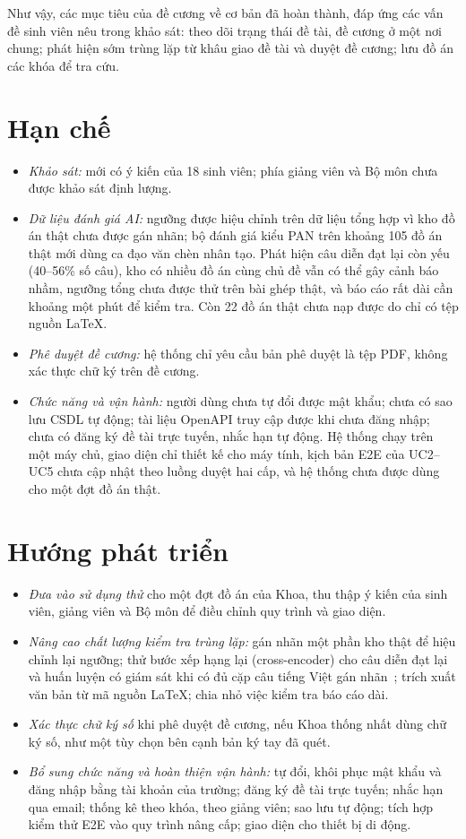 \documentclass[../main.tex]{subfiles}
\begin{document}
Như vậy, các mục tiêu của đề cương về cơ bản đã hoàn thành, đáp ứng các vấn đề sinh viên nêu trong khảo sát: theo dõi trạng thái đề tài, đề cương ở một nơi chung; phát hiện sớm trùng lặp từ khâu giao đề tài và duyệt đề cương; lưu đồ án các khóa để tra cứu.

\section*{Hạn chế}

\begin{itemize}
    \item \textit{Khảo sát:} mới có ý kiến của 18 sinh viên; phía giảng viên và Bộ môn chưa được khảo sát định lượng.
    \item \textit{Dữ liệu đánh giá AI:} ngưỡng được hiệu chỉnh trên dữ liệu tổng hợp vì kho đồ án thật chưa được gán nhãn; bộ đánh giá kiểu PAN trên khoảng 105 đồ án thật mới dùng ca đạo văn chèn nhân tạo. Phát hiện câu diễn đạt lại còn yếu (40--56\% số câu), kho có nhiều đồ án cùng chủ đề vẫn có thể gây cảnh báo nhầm, ngưỡng tổng chưa được thử trên bài ghép thật, và báo cáo rất dài cần khoảng một phút để kiểm tra. Còn 22 đồ án thật chưa nạp được do chỉ có tệp nguồn LaTeX.
    \item \textit{Phê duyệt đề cương:} hệ thống chỉ yêu cầu bản phê duyệt là tệp PDF, không xác thực chữ ký trên đề cương.
    \item \textit{Chức năng và vận hành:} người dùng chưa tự đổi được mật khẩu; chưa có sao lưu CSDL tự động; tài liệu OpenAPI truy cập được khi chưa đăng nhập; chưa có đăng ký đề tài trực tuyến, nhắc hạn tự động. Hệ thống chạy trên một máy chủ, giao diện chỉ thiết kế cho máy tính, kịch bản E2E của UC2--UC5 chưa cập nhật theo luồng duyệt hai cấp, và hệ thống chưa được dùng cho một đợt đồ án thật.
\end{itemize}

\section*{Hướng phát triển}

\begin{itemize}
    \item \textit{Đưa vào sử dụng thử} cho một đợt đồ án của Khoa, thu thập ý kiến của sinh viên, giảng viên và Bộ môn để điều chỉnh quy trình và giao diện.
    \item \textit{Nâng cao chất lượng kiểm tra trùng lặp:} gán nhãn một phần kho thật để hiệu chỉnh lại ngưỡng; thử bước xếp hạng lại (cross-encoder) cho câu diễn đạt lại và huấn luyện có giám sát khi có đủ cặp câu tiếng Việt gán nhãn~\cite{iqbal2025}; trích xuất văn bản từ mã nguồn LaTeX; chia nhỏ việc kiểm tra báo cáo dài.
    \item \textit{Xác thực chữ ký số} khi phê duyệt đề cương, nếu Khoa thống nhất dùng chữ ký số, như một tùy chọn bên cạnh bản ký tay đã quét.
    \item \textit{Bổ sung chức năng và hoàn thiện vận hành:} tự đổi, khôi phục mật khẩu và đăng nhập bằng tài khoản của trường; đăng ký đề tài trực tuyến; nhắc hạn qua email; thống kê theo khóa, theo giảng viên; sao lưu tự động; tích hợp kiểm thử E2E vào quy trình nâng cấp; giao diện cho thiết bị di động.
\end{itemize}
\end{document}

